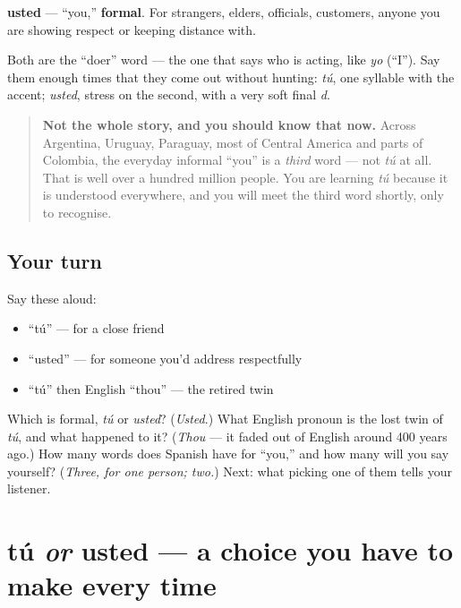 \textbf{usted} — \textquotedblleft{}you,\textquotedblright{} \textbf{formal}. For strangers, elders, officials, customers, anyone you are showing respect or keeping distance with.

Both are the \textquotedblleft{}doer\textquotedblright{} word — the one that says who is acting, like \emph{yo} (\textquotedblleft{}I\textquotedblright{}). Say them enough times that they come out without hunting: \emph{tú}, one syllable with the accent; \emph{usted}, stress on the second, with a very soft final \emph{d}.

\begin{quote}
\textbf{Not the whole story, and you should know that now.} Across Argentina, Uruguay, Paraguay, most of Central America and parts of Colombia, the everyday informal \textquotedblleft{}you\textquotedblright{} is a \emph{third} word — not \emph{tú} at all. That is well over a hundred million people. You are learning \emph{tú} because it is understood everywhere, and you will meet the third word shortly, only to recognise.
\end{quote}

\subsection*{Your turn}
Say these aloud:

\begin{itemize}
\raggedright
  \item \textquotedblleft{}tú\textquotedblright{} — for a close friend
  \item \textquotedblleft{}usted\textquotedblright{} — for someone you'd address respectfully
  \item \textquotedblleft{}tú\textquotedblright{} then English \textquotedblleft{}thou\textquotedblright{} — the retired twin
\end{itemize}

\begin{tcolorbox}[breakable,colback=teal!4,colframe=teal!35!black,title={Before you move on}]
Which is formal, \emph{tú} or \emph{usted}? (\emph{Usted}.) What English pronoun is the lost twin of \emph{tú}, and what happened to it? (\emph{Thou} — it faded out of English around 400 years ago.) How many words does Spanish have for \textquotedblleft{}you,\textquotedblright{} and how many will you say yourself? (\emph{Three, for one person; two.}) Next: what picking one of them tells your listener.
\end{tcolorbox}
\section[tú o usted]{tú \emph{or} usted — a choice you have to make every time}

